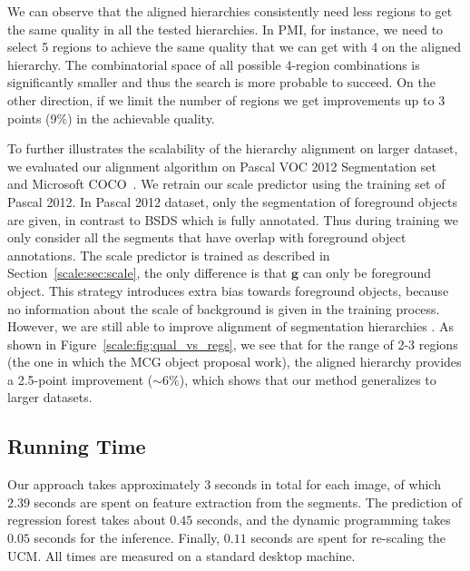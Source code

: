 We can observe that the aligned hierarchies consistently need less
regions to get the same quality in all the tested hierarchies.  In
PMI, for instance, we need to select 5 regions to achieve the same
quality that we can get with 4 on the aligned hierarchy. The
combinatorial space of all possible 4-region combinations is
significantly smaller and thus the search is more probable to
succeed. On the other direction, if we limit the number of regions we
get improvements up to 3 points (9\%) in the achievable quality.

To further illustrates the scalability of the hierarchy alignment on larger dataset, we evaluated our alignment algorithm on Pascal VOC 2012 Segmentation set~\citep{pascal:2011} and Microsoft COCO~\citep{coco:eccv}. We retrain our scale predictor using the training set of Pascal 2012. In Pascal 2012 dataset, only the segmentation of foreground objects are given, in contrast to BSDS which is fully annotated. Thus during training we only consider all the segments that have overlap with foreground object annotations. The scale predictor is trained as described in Section~\ref{scale:sec:scale}, the only difference is that $\mathbf{g}$ can only be foreground object. This strategy introduces extra bias towards foreground objects, because no information about the scale of background is given in the training process. However, we are still able to improve alignment of segmentation hierarchies . As shown in Figure~\ref{scale:fig:qual_vs_regs}, we see that for the range of 2-3 regions (the one in which the MCG object proposal work), the aligned hierarchy provides a 2.5-point improvement ($\sim$6\%), which shows that our method generalizes to larger datasets. 

\subsection{Running Time}
Our approach takes approximately 3 seconds in total for each image, of which $2.39$
seconds are spent on feature extraction from the segments. The prediction
of regression forest takes about $0.45$ seconds, and the dynamic
programming takes $0.05$ seconds for the inference. Finally, $0.11$
seconds are spent for re-scaling the UCM.
All times are measured on a standard desktop machine.



